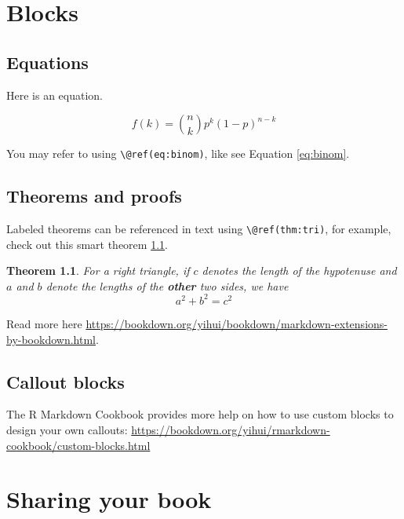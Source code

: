 \documentclass[
]{book}
\newtheorem{theorem}{Theorem}[chapter]
\theoremstyle{definition}
\theoremstyle{definition}
\theoremstyle{definition}
\theoremstyle{definition}
\theoremstyle{remark}
\begin{document}
\hypertarget{blocks}{%
\chapter{Blocks}\label{blocks}}

\hypertarget{equations}{%
\section{Equations}\label{equations}}

Here is an equation.

\begin{equation} 
  f\left(k\right) = \binom{n}{k} p^k\left(1-p\right)^{n-k}
  \label{eq:binom}
\end{equation}

You may refer to using \texttt{\textbackslash{}@ref(eq:binom)}, like see Equation \eqref{eq:binom}.

\hypertarget{theorems-and-proofs}{%
\section{Theorems and proofs}\label{theorems-and-proofs}}

Labeled theorems can be referenced in text using \texttt{\textbackslash{}@ref(thm:tri)}, for example, check out this smart theorem \ref{thm:tri}.

\begin{theorem}
\protect\hypertarget{thm:tri}{}\label{thm:tri}For a right triangle, if \(c\) denotes the \emph{length} of the hypotenuse
and \(a\) and \(b\) denote the lengths of the \textbf{other} two sides, we have
\[a^2 + b^2 = c^2\]
\end{theorem}

Read more here \url{https://bookdown.org/yihui/bookdown/markdown-extensions-by-bookdown.html}.

\hypertarget{callout-blocks}{%
\section{Callout blocks}\label{callout-blocks}}

The R Markdown Cookbook provides more help on how to use custom blocks to design your own callouts: \url{https://bookdown.org/yihui/rmarkdown-cookbook/custom-blocks.html}

\hypertarget{sharing-your-book}{%
\chapter{Sharing your book}\label{sharing-your-book}}
\end{document}
